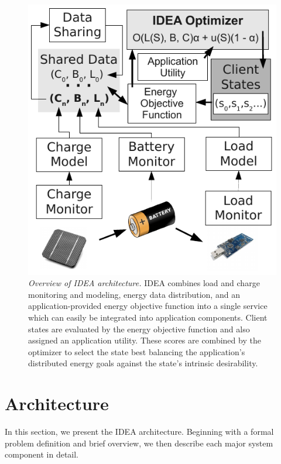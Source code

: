 \begin{figure}[t]
\begin{center}
\includegraphics[width=\hsize]{./figs/IDEAArchitecture.pdf}
\end{center}

\caption{\textit{Overview of IDEA architecture.} IDEA combines load and
charge monitoring and modeling, energy data distribution, and an
application-provided energy objective function into a single service which
can easily be integrated into application components. Client states are
evaluated by the energy objective function and also assigned an application
utility. These scores are combined by the optimizer to select the state best
balancing the application's distributed energy goals against the state's
intrinsic desirability.}

\label{fig-arch}
\end{figure}

\vfill\eject
\section{Architecture}
\label{sec-architecture}

In this section, we present the IDEA architecture. Beginning with a formal
problem definition and brief overview, we then describe each major system
component in detail.

